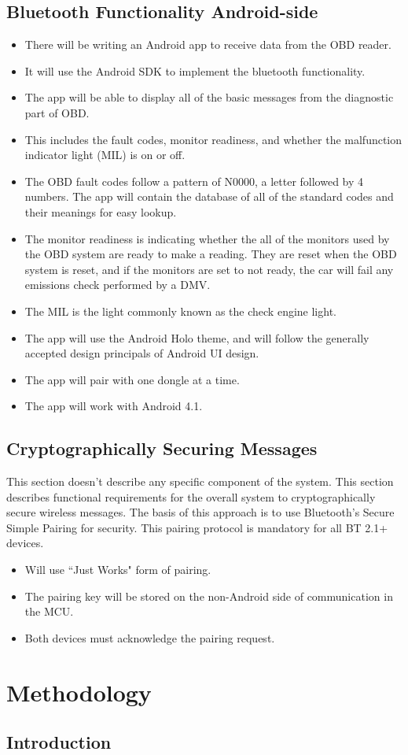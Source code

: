 \documentclass[12pt,letterpaper]{article}
\begin{document}
\subsection{Bluetooth Functionality Android-side}
\begin{itemize}
	\item There will be writing an Android app to receive data from the OBD reader.
	\item It will use the Android SDK to implement the bluetooth functionality.
	\item The app will be able to display all of the basic messages from the diagnostic part of OBD.
	\item This includes the fault codes, monitor readiness, and whether the malfunction indicator light (MIL) is on or off.
	\item The OBD fault codes follow a pattern of N0000, a letter followed by 4 numbers. The app will contain the database of all of the standard codes and their meanings for easy lookup. 
	\item  The monitor readiness is indicating whether the all of the monitors used by the OBD system are ready to make a reading. They are reset when the OBD system is reset, and if the monitors are set to not ready, the car will fail any emissions check performed by a DMV. 
	\item The MIL is the light commonly known as the check engine light. 
	\item The app will use the Android Holo theme, and will follow the generally accepted design principals of Android UI design.
	\item The app will pair with one dongle at a time.
	\item The app will work with Android 4.1.

\end{itemize}

\subsection{Cryptographically Securing Messages}
This section doesn't describe any specific component of the system. This section describes functional requirements for the overall system to cryptographically secure wireless messages. The basis of this approach is to use Bluetooth's Secure Simple Pairing for security. This pairing protocol is mandatory for all BT 2.1+ devices.

\begin{itemize}
	\item Will use ``Just Works" form of pairing.
	\item The pairing key will be stored on the non-Android side of communication in the MCU.
	\item Both devices must acknowledge the pairing request.
\end{itemize}

\section{Methodology}
\subsection{Introduction}
\end{document}
